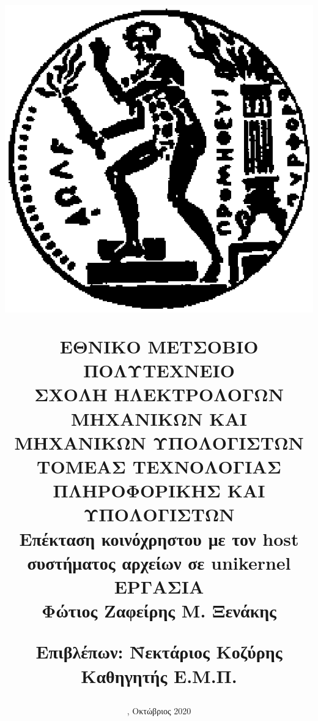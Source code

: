 \documentclass[12pt, a4paper, notitlepage]{report}
\newcommand{\en}[1]{\foreignlanguage{english}{#1}}
\newcommand{\host}{\en{host}}
\begin{document}
\title{
	\vspace*{-8ex}
	\begin{center}
		\includegraphics[scale=0.4]{pyrforos.eps}
	\end{center}
	\Large{Ε}\large{ΘΝΙΚΟ}
	\Large{Μ}\large{ΕΤΣΟΒΙΟ}
	\Large{Π}\large{ΟΛΥΤΕΧΝΕΙΟ} \\
	\normalsize{Σ}\small{ΧΟΛΗ}
	\normalsize{Η}\small{ΛΕΚΤΡΟΛΟΓΩΝ}
	\normalsize{Μ}\small{ΗΧΑΝΙΚΩΝ}
	\normalsize{Κ}\small{ΑΙ}
	\normalsize{Μ}\small{ΗΧΑΝΙΚΩΝ}
	\normalsize{Υ}\small{ΠΟΛΟΓΙΣΤΩΝ} \\
	\vspace{2ex}
	\normalsize{Τ}\small{ΟΜΕΑΣ}
	\normalsize{Τ}\small{ΕΧΝΟΛΟΓΙΑΣ}
	\normalsize{Π}\small{ΛΗΡΟΦΟΡΙΚΗΣ}
	\normalsize{Κ}\small{ΑΙ}
	\normalsize{Υ}\small{ΠΟΛΟΓΙΣΤΩΝ} \\
	\vspace{14ex}
	\large\textbf{Επέκταση κοινόχρηστου με τον \host{} συστήματος αρχείων σε \en{unikernel}} \\
	\vspace{14ex}
	 ΕΡΓΑΣΙΑ \\
	\vspace{1ex}
	\center\textbf{Φώτιος Ζαφείρης Μ. Ξενάκης}
	\vfill
	\begin{tabbing}
		\normalsize
		\textbf{Επιβλέπων}: \= Νεκτάριος Κοζύρης \\
							\> Καθηγητής Ε.Μ.Π.
	\end{tabbing}
}
\author{}	%
\date{
	, Οκτώβριος 2020
}
\maketitle
\thispagestyle{empty}
\end{document}

